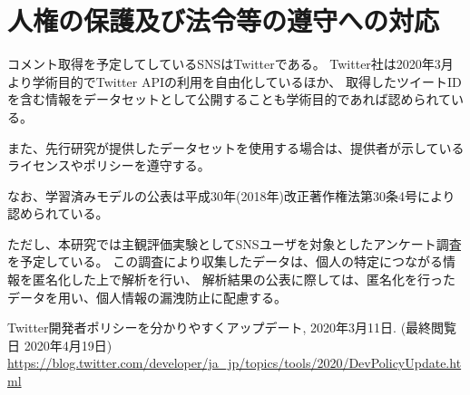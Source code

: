 
\section{人権の保護及び法令等の遵守への対応}

コメント取得を予定してしているSNSはTwitterである。
Twitter社は2020年3月より学術目的でTwitter APIの利用を自由化しているほか、
取得したツイートIDを含む情報をデータセットとして公開することも学術目的であれば認められている\cite{twitter_2020}。

また、先行研究が提供したデータセットを使用する場合は、提供者が示しているライセンスやポリシーを遵守する。

なお、学習済みモデルの公表は平成30年(2018年)改正著作権法第30条4号により認められている。

ただし、本研究では主観評価実験としてSNSユーザを対象としたアンケート調査を予定している。
この調査により収集したデータは、個⼈の特定につながる情報を匿名化した上で解析を⾏い、
解析結果の公表に際しては、匿名化を⾏ったデータを⽤い、個⼈情報の漏洩防⽌に配慮する。

\vspace{1cm}
{\footnotesize
	\begin{thebibliography}{99}
		\setcounter{enumiv}{11}
		 Twitter開発者ポリシーを分かりやすくアップデート, 2020年3月11日. (最終閲覧日 2020年4月19日) \url{https://blog.twitter.com/developer/ja_jp/topics/tools/2020/DevPolicyUpdate.html}
	\end{thebibliography}
}




